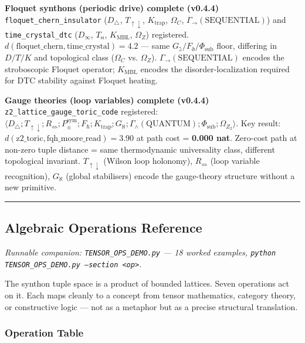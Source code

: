 \documentclass[12pt,a4paper]{article}
\begin{document}
\textbf{Floquet synthons (periodic drive)  complete (v0.4.4)}
\texttt{floquet\_chern\_insulator} ($D_{\bigtriangleup}$, $T_{\uparrow\downarrow}$, $K_{\text{trap}}$, $\Omega_C$, $\Gamma_{\to}(\text{SEQUENTIAL})$) and \texttt{time\_crystal\_dtc} ($D_{\infty}$, $T_{\bowtie}$, $K_{\text{MBL}}$, $\Omega_Z$) registered. $d(\text{floquet\_chern}, \text{time\_crystal}) = 4.2$ --- same $G_{\gimel}/F_{\eth}/\Phi_{\text{sub}}$ floor, differing in $D/T/K$ and topological class ($\Omega_C$ vs. $\Omega_Z$). $\Gamma_{\to}(\text{SEQUENTIAL})$ encodes the stroboscopic Floquet operator; $K_{\text{MBL}}$ encodes the disorder-localization required for DTC stability against Floquet heating.

\textbf{Gauge theories (loop variables)  complete (v0.4.4)}
\texttt{z2\_lattice\_gauge\_toric\_code} registered: $\langle D_{\bigtriangleup}; T_{\uparrow\downarrow}; R_{\Leftrightarrow}; P_{\pm}^{\text{sym}}; F_{\hbar}; K_{\text{trap}}; G_{\aleph}; \Gamma_{\wedge}(\text{QUANTUM}); \Phi_{\text{sub}}; \Omega_{Z_2} \rangle$. Key result: $d(\text{z2\_toric}, \text{fqh\_moore\_read}) = 3.90$ at path cost = \textbf{0.000 nat}. Zero-cost path at non-zero tuple distance = same thermodynamic universality class, different topological invariant. $T_{\uparrow\downarrow}$ (Wilson loop holonomy), $R_{\Leftrightarrow}$ (loop variable recognition), $G_{\aleph}$ (global stabilisers) encode the gauge-theory structure without a new primitive.

\begin{center}
\rule{0.5\textwidth}{0.4pt}
\end{center}

\subsection{Algebraic Operations Reference}

\emph{Runnable companion: \texttt{TENSOR\_OPS\_DEMO.py} --- 18 worked examples, \texttt{python TENSOR\_OPS\_DEMO.py --section \textless{}op\textgreater{}}.}

The synthon tuple space is a product of bounded lattices. Seven operations act on it. Each maps cleanly to a concept from tensor mathematics, category theory, or constructive logic --- not as a metaphor but as a precise structural translation.

\subsubsection{Operation Table}
\end{document}
